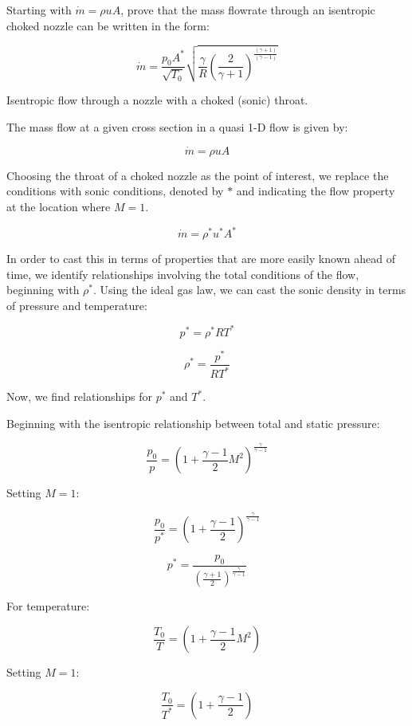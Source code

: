 \documentclass[../main.tex]{subfiles}
\begin{document}

Starting with \(\dot{m} = \rho u A\), prove that the mass flowrate through an isentropic choked nozzle can be written in the form:

\[
    \dot{m} = \frac{p_0 A^*}{\sqrt{T_0}} \sqrt{\frac{\gamma}{R} \left({\frac{2}{\gamma+1}}\right)^{\frac{(\gamma+1)}{(\gamma-1)}}}
\]

\assumptions{}
Isentropic flow through a nozzle with a choked (sonic) throat.

\solution{}

The mass flow at a given cross section in a quasi 1-D flow is given by:

\[
    \dot{m} = \rho u A
\]

Choosing the throat of a choked nozzle as the point of interest, we replace the conditions with sonic conditions, denoted by \(*\) and indicating the flow property at the location where \(M=1\).

\[
    \dot{m} = \rho^* u^* A^*
\]

In order to cast this in terms of properties that are more easily known ahead of time, we identify relationships involving the total conditions of the flow, beginning with \(\rho^*\).
Using the ideal gas law, we can cast the sonic density in terms of pressure and temperature:

\[
    p^* = \rho^* R T^*
\]

\[
    \rho^* = \frac{p^*}{RT^*}
\]

Now, we find relationships for \(p^*\) and \(T^*\).

Beginning with the isentropic relationship between total and static pressure:

\[
    \frac{p_0}{p} = \left({
        1 + \frac{\gamma-1}{2}M^2
    }\right)^{\frac{\gamma}{\gamma-1}}
\]

Setting \(M=1\):

\[
    \frac{p_0}{p^*} = \left({
        1 + \frac{\gamma-1}{2}
    }\right)^{\frac{\gamma}{\gamma-1}}
\]

\[
    p^* = \frac{p_0}{\left({
        \frac{\gamma+1}{2}
    }\right)^{\frac{\gamma}{\gamma-1}}}
\]

For temperature:

\[
    \frac{T_0}{T} = \left({
        1 + \frac{\gamma-1}{2}M^2
    }\right)
\]

Setting \(M=1\):

\[
    \frac{T_0}{T^*} = \left({
        1 + \frac{\gamma-1}{2}
    }\right)
\]
\end{document}
